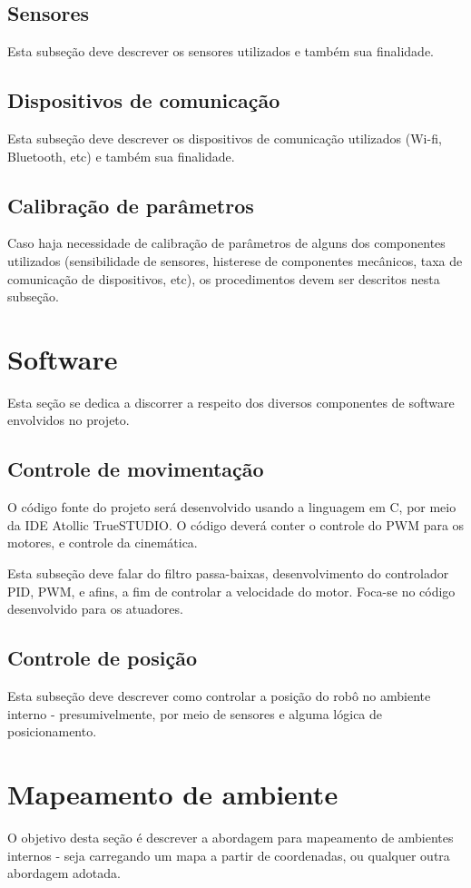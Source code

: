 \subsection{Sensores}
{\color{red} Esta subseção deve descrever os sensores utilizados e também sua finalidade.}

\subsection{Dispositivos de comunicação}
{\color{red} Esta subseção deve descrever os dispositivos de comunicação utilizados (Wi-fi, Bluetooth, etc) e também sua
finalidade.}

\subsection{Calibração de parâmetros}
{\color{red} Caso haja necessidade de calibração de parâmetros de alguns dos componentes utilizados (sensibilidade de
sensores, histerese de componentes mecânicos, taxa de comunicação de dispositivos, etc), os procedimentos devem ser
descritos nesta subseção.}

\section{Software}
{\color{red} Esta seção se dedica a discorrer a respeito dos diversos componentes de software envolvidos no projeto.}

\subsection{Controle de movimentação}
O código fonte do projeto será desenvolvido usando a linguagem em C, por meio da IDE Atollic TrueSTUDIO.
O código deverá conter o controle do PWM para os motores, e controle da cinemática.

{\color{red} Esta subseção deve falar do filtro passa-baixas, desenvolvimento do controlador PID, PWM, e afins, a fim de
controlar a velocidade do motor. Foca-se no código desenvolvido para os atuadores.}

\subsection{Controle de posição}
{\color{red} Esta subseção deve descrever como controlar a posição do robô no ambiente interno - presumivelmente, por
meio de sensores e alguma lógica de posicionamento.}

\section{Mapeamento de ambiente}
{\color{red} O objetivo desta seção é descrever a abordagem para mapeamento de ambientes internos - seja carregando um
mapa a partir de coordenadas, ou qualquer outra abordagem adotada.}